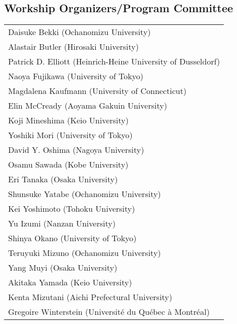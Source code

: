 \documentclass[12pt]{jarticle}
\begin{document}
\subsection*{Workship Organizers/Program Committee}
\begin{flushleft}
\begin{tabular}{l}
Daisuke Bekki (Ochanomizu University) \\
Alastair Butler (Hirosaki University) \\
Patrick D. Elliott (Heinrich-Heine University of Dusseldorf) \\
Naoya Fujikawa (University of Tokyo) \\
Magdalena Kaufmann (University of Connecticut) \\
Elin McCready (Aoyama Gakuin University) \\
Koji Mineshima (Keio University) \\
Yoshiki Mori (University of Tokyo) \\
David Y. Oshima (Nagoya University) \\
Osamu Sawada (Kobe University) \\
Eri Tanaka (Osaka University) \\
Shunsuke Yatabe (Ochanomizu University) \\
Kei Yoshimoto (Tohoku University) \\
Yu Izumi (Nanzan University) \\
Shinya Okano (University of Tokyo) \\
Teruyuki Mizuno (Ochanomizu University) \\
Yang Muyi (Osaka University) \\
Akitaka Yamada (Keio University) \\
Kenta Mizutani (Aichi Prefectural University) \\
Gregoire Winterstein (Université du Québec à Montréal) \\

\end{tabular}
\end{flushleft}
\newpage
  
  
\end{document}
